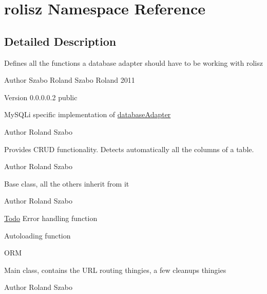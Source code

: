 \hypertarget{namespacerolisz}{
\section{rolisz Namespace Reference}
\label{namespacerolisz}
}


\subsection{Detailed Description}
Defines all the functions a database adapter should have to be working with rolisz

\begin{DoxyAuthor}{Author}
Szabo Roland  Szabo Roland 2011 
\end{DoxyAuthor}
\begin{DoxyVersion}{Version}
0.0.0.0.2  public
\end{DoxyVersion}
MySQLi specific implementation of \hyperlink{interfacedatabase_adapter}{databaseAdapter}

\begin{DoxyAuthor}{Author}
Roland Szabo
\end{DoxyAuthor}
Provides CRUD functionality. Detects automatically all the columns of a table.

\begin{DoxyAuthor}{Author}
Roland Szabo
\end{DoxyAuthor}
Base class, all the others inherit from it

\begin{DoxyAuthor}{Author}
Roland Szabo 
\end{DoxyAuthor}
\begin{Desc}
\item[\hyperlink{todo__todo000001}{Todo}]Error handling function 

Autoloading function 

ORM \end{Desc}


Main class, contains the URL routing thingies, a few cleanups thingies

\begin{DoxyAuthor}{Author}
Roland Szabo 
\end{DoxyAuthor}
